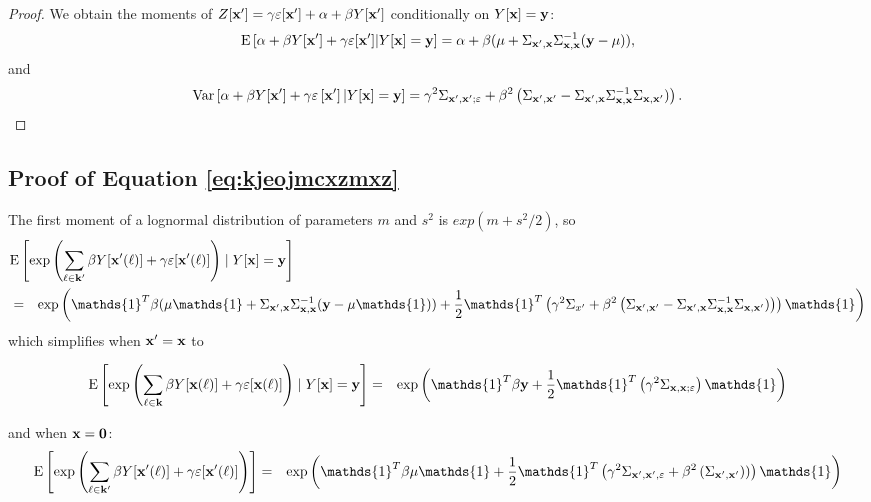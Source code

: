 \begin{proof}
We obtain the moments of $Z[\mathbf{x}']=\gamma
\varepsilon[\mathbf{x}']+\alpha+\beta
Y[\mathbf{x}']$ conditionally on $Y[\mathbf{x}]=\mathbf{y}$:
$$\mathrm{E}\left[\alpha+\beta
Y[\mathbf{x}']+\gamma
\varepsilon[\mathbf{x}']|
Y[\mathbf{x}]=\mathbf{y}\right]
=\alpha+\beta(\mu+\Sigma_{\mathbf{x}',\mathbf{x}}\Sigma_{\mathbf{x},\mathbf{x}}^{-1} (\mathbf{y}-\mu)),$$
and 
$$\mathrm{Var}\left[\alpha+\beta
Y[\mathbf{x}']+\gamma
\varepsilon\left[\mathbf{x}'\right]|
Y[\mathbf{x}]=\mathbf{y}\right]
=\gamma^2\Sigma_{\mathbf{x}',\mathbf{x}';\varepsilon}+\beta^2\left(\Sigma_{\mathbf{x}',\mathbf{x}'}-\Sigma_{\mathbf{x}',\mathbf{x}}\Sigma_{\mathbf{x},\mathbf{x}}^{-1}\Sigma_{\mathbf{x},\mathbf{x}'})\right).$$
\end{proof}



\subsection{Proof of Equation \eqref{eq:kjeojmcxzmxz}}
\label{sec:ijojeorijgo}

The first moment of a lognormal distribution of parameters $m$ and $s^2$ is $exp(m+s^2/2)$, so 
\begin{eqnarray*}
\lefteqn{
\mathrm{E}\left[\exp\left(\sum_{\ell\in\sampleindex'}\beta \Signal[\position'(\ell)]+\gamma \varepsilon[\position'(\ell)]\right)\mid \Signal[\position]=\signal\right]}
\\&=&
\exp\left(\mathds{1}^T\beta(\mu\mathds{1}+\Sigma_{\position',\position}\Sigma_{\position,\position}^{-1} (\signal-\mu\mathds{1}))+
\frac12\mathds{1}^T\left(
\gamma^2\provar_{x'}+\beta^2\left(\provar_{\position',\position'}-\provar_{\position',\position}\provar_{\position,\position}^{-1}\provar_{\position,\position'})\right)
\right)\mathds{1}\right)
\end{eqnarray*}
which simplifies when $\mathbf{x}'=\mathbf{x}$ to 

\begin{eqnarray*}
\mathrm{E}\left[\exp\left(\sum_{\ell\in\sampleindex}\beta \Signal[\position(\ell)]+\gamma \varepsilon[\position(\ell)]\right)\mid \Signal[\position]=\signal\right]&=&
\exp\left(\mathds{1}^T\beta\signal+
\frac12\mathds{1}^T\left(
\gamma^2\provar_{\position,\position;\varepsilon}
\right)\mathds{1}\right)
\end{eqnarray*}

and when $\mathbf{x}=\mathbf{0}$:
\begin{eqnarray*}
\mathrm{E}\left[\exp\left(\sum_{\ell\in\sampleindex'}\beta \Signal[\position'(\ell)]+\gamma \varepsilon[\position'(\ell)]\right)\right]
&=&
\exp\left(\mathds{1}^T\beta\mu\mathds{1}+
\frac12\mathds{1}^T\left(
\gamma^2\provar_{\position',\position',\varepsilon}+\beta^2\left(\provar_{\position',\position'})\right)
\right)\mathds{1}\right)
\end{eqnarray*}

